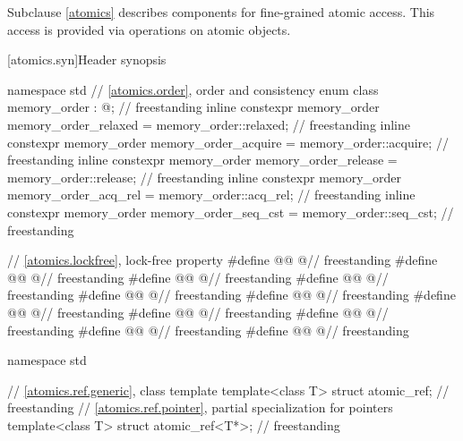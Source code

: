 \pnum
Subclause \ref{atomics} describes components for fine-grained atomic access.
This access is provided via operations on atomic objects.

[atomics.syn]{Header  synopsis}

%
\begin{codeblock}
namespace std {
  // \ref{atomics.order}, order and consistency
  enum class memory_order : @\unspecnc@;                                            // freestanding
  inline constexpr memory_order memory_order_relaxed = memory_order::relaxed;       // freestanding
  inline constexpr memory_order memory_order_acquire = memory_order::acquire;       // freestanding
  inline constexpr memory_order memory_order_release = memory_order::release;       // freestanding
  inline constexpr memory_order memory_order_acq_rel = memory_order::acq_rel;       // freestanding
  inline constexpr memory_order memory_order_seq_cst = memory_order::seq_cst;       // freestanding
}

// \ref{atomics.lockfree}, lock-free property
#define @@ @\unspecnc@                                           // freestanding
#define @@ @\unspecnc@                                           // freestanding
#define @@ @\unspecnc@                                        // freestanding
#define @@ @\unspecnc@                                       // freestanding
#define @@ @\unspecnc@                                       // freestanding
#define @@ @\unspecnc@                                        // freestanding
#define @@ @\unspecnc@                                          // freestanding
#define @@ @\unspecnc@                                            // freestanding
#define @@ @\unspecnc@                                           // freestanding
#define @@ @\unspecnc@                                          // freestanding
#define @@ @\unspecnc@                                        // freestanding

namespace std {
  // \ref{atomics.ref.generic}, class template 
  template<class T> struct atomic_ref;                                              // freestanding
  // \ref{atomics.ref.pointer}, partial specialization for pointers
  template<class T> struct atomic_ref<T*>;                                          // freestanding

}
\end{codeblock}
